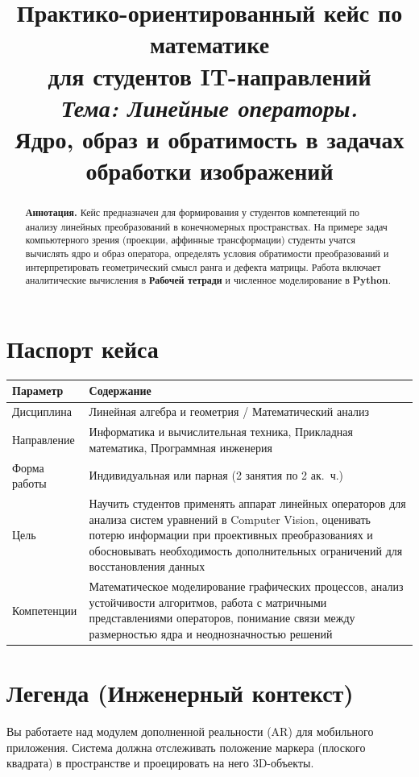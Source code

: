 \documentclass[a4paper,12pt]{article}
\title{\vspace{-2cm}\textbf{Практико-ориентированный кейс по математике}\\[0.5cm]
\large для студентов IT-направлений\\[0.3cm]
\textit{Тема: Линейные операторы.}\\ Ядро, образ и обратимость в задачах обработки изображений}
\author{}
\date{}
\begin{document}
\maketitle
\thispagestyle{fancy}

\begin{abstract}
\noindent\textbf{Аннотация.} Кейс предназначен для формирования у студентов компетенций по анализу линейных преобразований в конечномерных пространствах. На примере задач компьютерного зрения (проекции, аффинные трансформации) студенты учатся вычислять ядро и образ оператора, определять условия обратимости преобразований и интерпретировать геометрический смысл ранга и дефекта матрицы. Работа включает аналитические вычисления в \textbf{Рабочей тетради} и численное моделирование в \textbf{Python}.
\end{abstract}

\tableofcontents
\newpage

\section{Паспорт кейса}
\begin{center}
\renewcommand{\arraystretch}{1.4}
\begin{tabularx}{\textwidth}{@{}lX@{}}
\toprule
\textbf{Параметр} & \textbf{Содержание} \\
\midrule
Дисциплина & Линейная алгебра и геометрия / Математический анализ \\
Направление & Информатика и вычислительная техника, Прикладная математика, Программная инженерия \\
Форма работы & Индивидуальная или парная (2 занятия по 2 ак.~ч.) \\
Цель & Научить студентов применять аппарат линейных операторов для анализа систем уравнений в Computer Vision, оценивать потерю информации при проективных преобразованиях и обосновывать необходимость дополнительных ограничений для восстановления данных \\
Компетенции & Математическое моделирование графических процессов, анализ устойчивости алгоритмов, работа с матричными представлениями операторов, понимание связи между размерностью ядра и неоднозначностью решений \\
\bottomrule
\end{tabularx}
\end{center}

\section{Легенда (Инженерный контекст)}
Вы работаете над модулем дополненной реальности (AR) для мобильного приложения. Система должна отслеживать положение маркера (плоского квадрата) в пространстве и проецировать на него 3D-объекты. 
\end{document}
